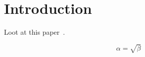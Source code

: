 \section{Introduction} \label{introduction}


Loot at this paper~\cite{einstein1905elektrodynamik}.

\begin{equation}
    \label{simple_equation}
    \alpha = \sqrt{ \beta }
\end{equation}
